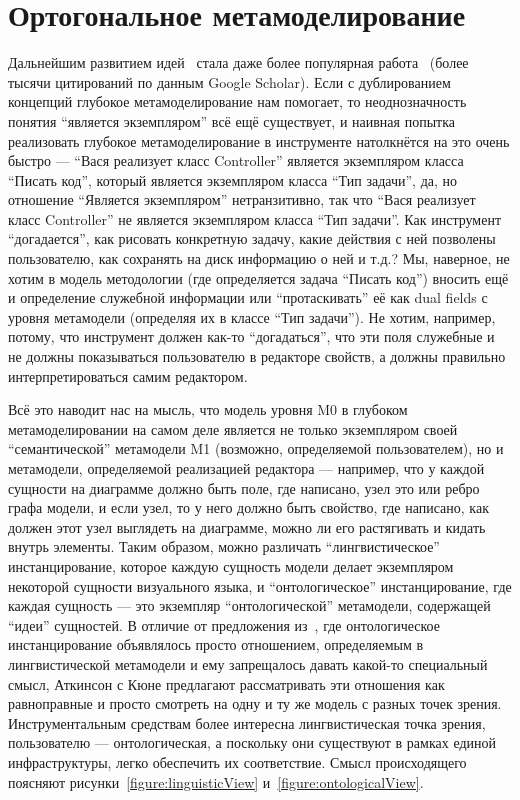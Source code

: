 \documentclass[a5paper]{article}
\begin{document}
\section{Ортогональное метамоделирование}

Дальнейшим развитием идей~\cite{atkinson2001multilevel} стала даже более популярная работа~\cite{atkinson2003model} (более тысячи цитирований по данным Google Scholar). Если с дублированием концепций глубокое метамоделирование нам помогает, то неоднозначность понятия ``является экземпляром'' всё ещё существует, и наивная попытка реализовать глубокое метамоделирование в инструменте натолкнётся на это очень быстро --- ``Вася реализует класс Controller'' является экземпляром класса ``Писать код'', который является экземпляром класса ``Тип задачи'', да, но отношение ``Является экземпляром'' нетранзитивно, так что ``Вася реализует класс Controller'' не является экземпляром класса ``Тип задачи''. Как инструмент ``догадается'', как рисовать конкретную задачу, какие действия с ней позволены пользователю, как сохранять на диск информацию о ней и т.д.? Мы, наверное, не хотим в модель методологии (где определяется задача ``Писать код'') вносить ещё и определение служебной информации или ``протаскивать'' её как dual fields с уровня метамодели (определяя их в классе ``Тип задачи''). Не хотим, например, потому, что инструмент должен как-то ``догадаться'', что эти поля служебные и не должны показываться пользователю в редакторе свойств, а должны правильно интерпретироваться самим редактором.

Всё это наводит нас на мысль, что модель уровня M0 в глубоком метамоделировании на самом деле является не только экземпляром своей ``семантической'' метамодели M1 (возможно, определяемой пользователем), но и метамодели, определяемой реализацией редактора --- например, что у каждой сущности на диаграмме должно быть поле, где написано, узел это или ребро графа модели, и если узел, то у него должно быть свойство, где написано, как должен этот узел выглядеть на диаграмме, можно ли его растягивать и кидать внутрь элементы. Таким образом, можно различать ``лингвистическое'' инстанцирование, которое каждую сущность модели делает экземпляром некоторой сущности визуального языка, и ``онтологическое'' инстанцирование, где каждая сущность --- это экземпляр ``онтологической'' метамодели, содержащей ``идеи'' сущностей. В отличие от предложения из~\cite{bezivin1997ontology}, где онтологическое инстанцирование объявлялось просто отношением, определяемым в лингвистической метамодели и ему запрещалось давать какой-то специальный смысл, Аткинсон с Кюне предлагают рассматривать эти отношения как равноправные и просто смотреть на одну и ту же модель с разных точек зрения. Инструментальным средствам более интересна лингвистическая точка зрения, пользователю --- онтологическая, а поскольку они существуют в рамках единой инфраструктуры, легко обеспечить их соответствие. Смысл происходящего поясняют рисунки~\ref{figure:linguisticView} и~\ref{figure:ontologicalView}.
\end{document}
